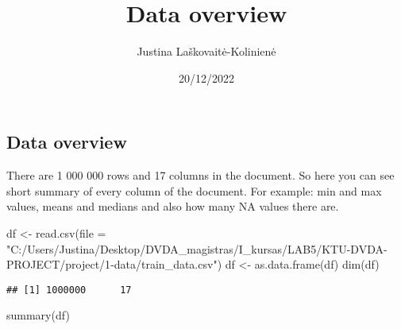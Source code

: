 \documentclass[
]{article}
\title{Data overview}
\author{Justina Laškovaitė-Kolinienė}
\date{20/12/2022}
\newenvironment{Shaded}{\begin{snugshade}}{\end{snugshade}}
\newcommand{\AttributeTok}[1]{\textcolor[rgb]{0.77,0.63,0.00}{#1}}
\newcommand{\FunctionTok}[1]{\textcolor[rgb]{0.00,0.00,0.00}{#1}}
\newcommand{\NormalTok}[1]{#1}
\newcommand{\OtherTok}[1]{\textcolor[rgb]{0.56,0.35,0.01}{#1}}
\newcommand{\StringTok}[1]{\textcolor[rgb]{0.31,0.60,0.02}{#1}}
\begin{document}
\maketitle

\hypertarget{data-overview}{%
\subsection{Data overview}\label{data-overview}}

There are 1 000 000 rows and 17 columns in the document. So here you can
see short summary of every column of the document. For example: min and
max values, means and medians and also how many NA values there are.

\begin{Shaded}
\begin{Highlighting}[]
\NormalTok{df }\OtherTok{\textless{}{-}} \FunctionTok{read.csv}\NormalTok{(}\AttributeTok{file =} \StringTok{"C:/Users/Justina/Desktop/DVDA\_magistras/I\_kursas/LAB5/KTU{-}DVDA{-}PROJECT/project/1{-}data/train\_data.csv"}\NormalTok{)}
\NormalTok{df }\OtherTok{\textless{}{-}} \FunctionTok{as.data.frame}\NormalTok{(df)}
\FunctionTok{dim}\NormalTok{(df)}
\end{Highlighting}
\end{Shaded}

\begin{verbatim}
## [1] 1000000      17
\end{verbatim}

\begin{Shaded}
\begin{Highlighting}[]
\FunctionTok{summary}\NormalTok{(df)}
\end{Highlighting}
\end{Shaded}
\end{document}
